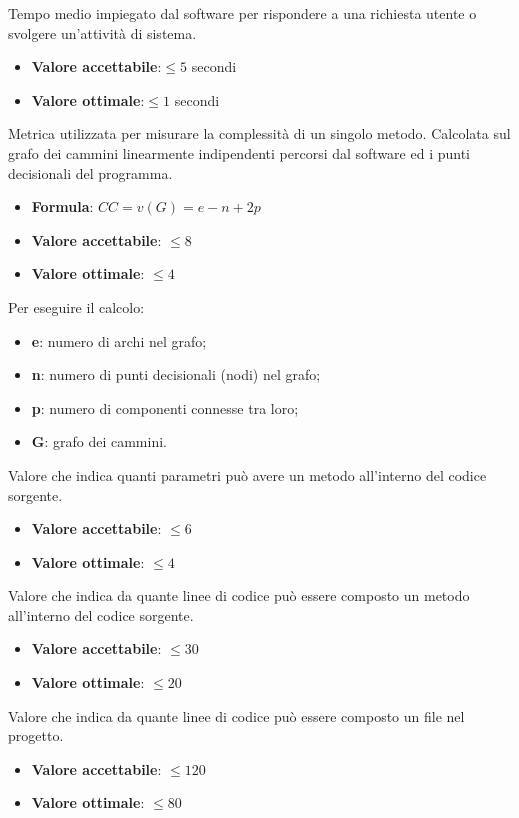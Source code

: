 Tempo medio impiegato dal software per rispondere a una richiesta utente o svolgere un’attività di sistema. 
\begin{itemize}
    \item \textbf{Valore accettabile}:$\leq5$ secondi
    \item \textbf{Valore ottimale}:$\leq1$ secondi
\end{itemize}  

Metrica utilizzata per misurare la complessità di un singolo metodo. Calcolata sul grafo dei cammini linearmente indipendenti percorsi dal software ed i punti decisionali del programma.
\begin{itemize}
    \item \textbf{Formula}: $CC=v(G)=e-n+2p$
    \item \textbf{Valore accettabile}: $\leq8$
    \item \textbf{Valore ottimale}: $\leq4$
\end{itemize}  
Per eseguire il calcolo:
\begin{itemize}
    \item \textbf{e}: numero di archi nel grafo;
    \item \textbf{n}: numero di punti decisionali (nodi) nel grafo;
    \item \textbf{p}: numero di componenti connesse tra loro;
    \item \textbf{G}: grafo dei cammini.
\end{itemize}

Valore che indica quanti parametri può avere un metodo all'interno del codice sorgente.
\begin{itemize}
    \item \textbf{Valore accettabile}: $\leq6$
    \item \textbf{Valore ottimale}: $\leq4$
\end{itemize} 

Valore che indica da quante linee di codice può essere composto un metodo all'interno del codice sorgente.
\begin{itemize}
    \item \textbf{Valore accettabile}: $\leq30$
    \item \textbf{Valore ottimale}: $\leq20$
\end{itemize} 

Valore che indica da quante linee di codice può essere composto un file nel progetto.
\begin{itemize}
    \item \textbf{Valore accettabile}: $\leq120$
    \item \textbf{Valore ottimale}: $\leq80$
\end{itemize} 

